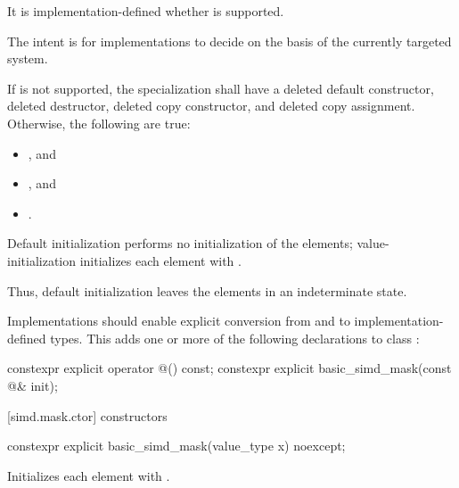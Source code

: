It is implementation-defined whether  is supported.
\begin{note}The intent is for implementations to decide on the basis of the currently targeted system.\end{note}

If  is not supported, the specialization shall have a deleted default constructor, deleted destructor, deleted copy constructor, and deleted copy assignment.
Otherwise, the following are true:
\begin{itemize}
  \item {}, and
  \item {}, and
  \item {}.
\end{itemize}

\pnum
Default initialization performs no initialization of the elements; value-initialization initializes each element with . \begin{note}Thus, default initialization leaves the elements in an indeterminate state.\end{note}

\pnum
Implementations should enable explicit conversion from and to implementation-defined types. This adds one or more of the following declarations to class :

\begin{codeblock}
constexpr explicit operator @\impdef@() const;
constexpr explicit basic_simd_mask(const @\impdef@& init);
\end{codeblock}

\pnum
{}

[simd.mask.ctor]{ constructors}

\begin{itemdecl}
constexpr explicit basic_simd_mask(value_type x) noexcept;
\end{itemdecl}

\begin{itemdescr}
  \pnum\effects
  Initializes each element with .
\end{itemdescr}


